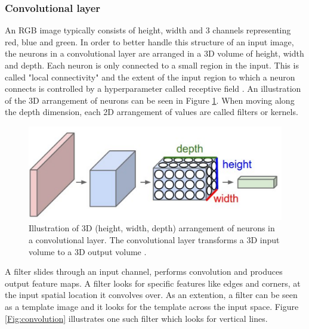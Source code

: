 \subsubsection{Convolutional layer}

An RGB image typically consists of height, width and 3 channels representing red, blue and green. In order to better handle this structure of an input image, the neurons in a convolutional layer are arranged in a 3D volume of height, width and depth. Each neuron is only connected to a small region in the input. This is called "local connectivity" and the extent of the input region to which a neuron connects is controlled by a hyperparameter called receptive field \cite{cs231n}. An illustration of the 3D arrangement of neurons can be seen in Figure \ref{Fig:cnn_neuron}. When moving along the depth dimension, each 2D arrangement of values are called filters or kernels.

	\begin{figure}[h]
		\centering
		\includegraphics[width=.4\linewidth]{images/conv_3dneurons}
		\caption{Illustration of 3D (height, width, depth) arrangement of neurons in a convolutional layer. The convolutional layer transforms a 3D input volume to a 3D output volume  \cite{cs231n}.}
		\label{Fig:cnn_neuron}
	\end{figure}
	
A filter slides through an input channel, performs convolution and produces output feature maps. A filter looks for specific features like edges and corners, at the input spatial location it convolves over. As an extention, a filter can be seen as a template image and it looks for the template across the input space. Figure \ref{Fig:convolution} illustrates one such filter which looks for vertical lines. 

